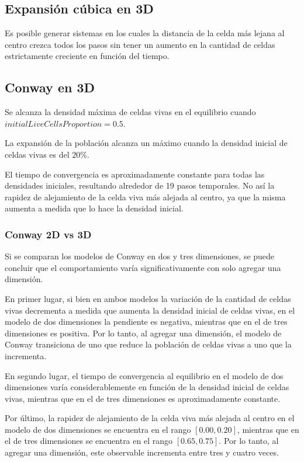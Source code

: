 \subsection{Expansión cúbica en 3D}\label{subsec:cubito-3D-conc}

Es posible generar sistemas en los cuales la distancia de la celda más lejana al centro crezca todos los pasos sin tener un aumento en la
cantidad de celdas estrictamente creciente en función del tiempo.

\subsection{Conway en 3D}\label{subsec:conway-en-3D-conc}

Se alcanza la densidad máxima de celdas vivas en el equilibrio cuando $initialLiveCellsProportion = 0.5$.

La expansión de la población alcanza un máximo cuando la densidad inicial de celdas vivas es del $20\%$.

El tiempo de convergencia es aproximadamente constante para todas las densidades iniciales,
resultando alrededor de 19 pasos temporales.
No así la rapidez de alejamiento de la celda viva más alejada al centro, ya que la misma aumenta a medida
que lo hace la densidad inicial.

\subsubsection{Conway 2D vs 3D}\label{subsubsec:conway-2D-vs-3D-conc}
Si se comparan los modelos de Conway en dos y tres dimensiones, se puede concluir que el comportamiento
varía significativamente con solo agregar una dimensión.

En primer lugar, si bien en ambos modelos la variación de la cantidad de celdas vivas decrementa a medida que aumenta
la densidad inicial de celdas vivas, en el modelo de dos dimensiones la pendiente es negativa, mientras
que en el de tres dimensiones es positiva.
Por lo tanto, al agregar una dimensión, el modelo de Conway transiciona de uno que reduce la población
de celdas vivas a uno que la incrementa.

En segundo lugar, el tiempo de convergencia al equilibrio en el modelo de dos dimensiones varía
considerablemente en función de la densidad inicial de celdas vivas, mientras que en el de tres
dimensiones es aproximadamente constante.

Por último, la rapidez de alejamiento de la celda viva más alejada al centro en el modelo de dos dimensiones
se encuentra en el rango $[0.00, 0.20]$, mientras que en el de tres dimensiones se encuentra en el rango
$[0.65, 0.75]$.
Por lo tanto, al agregar una dimensión, este observable incrementa entre tres y cuatro veces.

